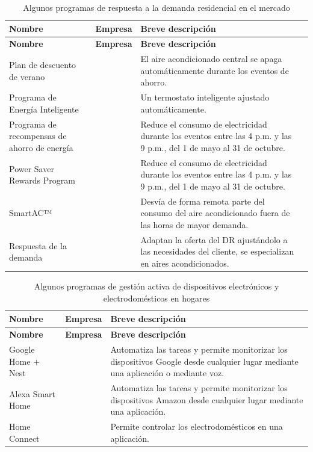 \documentclass[11pt,a4paper]{book}
\begin{document}
\begin{longtable}{|p{3cm}|p{2cm}|p{5.5cm}|p{1.5cm}|}
    \caption{Algunos programas de respuesta a la demanda residencial en el mercado} \label{tab:DERs1} \\
    \hline
    \textbf{Nombre} & \textbf{Empresa} & \textbf{Breve descripción}\\
    \hline
    \endfirsthead

    \hline
    \textbf{Nombre} & \textbf{Empresa} & \textbf{Breve descripción}\\
    \hline
    \endhead

    \hline Plan de descuento de verano & \cite{Edison2025} & El aire acondicionado central se apaga automáticamente durante los eventos de ahorro.\\
    \hline Programa de Energía Inteligente & \cite{Edison2025} & Un termostato inteligente ajustado automáticamente.\\
    \hline Programa de recompensas de ahorro de energía & \cite{Edison2025} & Reduce el consumo de electricidad durante los eventos entre las 4 p.m. y las 9 p.m., del 1 de mayo al 31 de octubre.\\
    \hline Power Saver Rewards Program & \cite{PG2025} & Reduce el consumo de electricidad durante los eventos entre las 4 p.m. y las 9 p.m., del 1 de mayo al 31 de octubre.\\
    \hline SmartAC™ & \cite{PG2025} & Desvía de forma remota parte del consumo del aire acondicionado fuera de las horas de mayor demanda.\\
    \hline Respuesta de la demanda & \cite{Trane2025} & Adaptan la oferta del DR ajustándolo a las necesidades del cliente, se especializan en aires acondicionados.\\
    
    
    \hline
\end{longtable}

\begin{longtable}{|p{3cm}|p{2cm}|p{5.5cm}|}
    \caption{Algunos programas de gestión activa de dispositivos electrónicos y electrodomésticos en hogares} \label{tab:DERs2} \\
    \hline
    \textbf{Nombre} & \textbf{Empresa} & \textbf{Breve descripción}\\
    \hline
    \endfirsthead

    \hline
    \textbf{Nombre} & \textbf{Empresa} & \textbf{Breve descripción}\\
    \hline
    \endhead

    \hline Google Home + Nest & \cite{Google2025} & Automatiza las tareas y permite monitorizar los dispositivos Google desde cualquier lugar mediante una aplicación o mediante voz.\\
    \hline Alexa Smart Home & \cite{Alexa2025} & Automatiza las tareas y permite monitorizar los dispositivos Amazon desde cualquier lugar mediante una aplicación.\\
    \hline Home Connect & \cite{BSH2025} & Permite controlar los electrodomésticos en una aplicación.\\
    
    
    \hline
\end{longtable}
\end{document}

